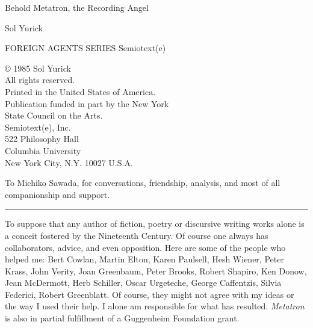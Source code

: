 \documentclass[11pt,twoside,draft]{memoir}
\newcommand{\titlePageTitle}[1]{ 
{ \Large #1 }}
\newcommand{\titlePageAuthor}[1]{ 
{ \large #1 }}
\begin{document}

{
	\raggedright
\titlePageTitle{Behold Metatron, the Recording Angel} \linebreak
\titlePageAuthor{Sol Yurick} \par
}

\clearpage 


{
FOREIGN AGENTS SERIES
Semiotext(e)

© 1985 Sol Yurick \\
All rights reserved. \\
Printed in the United States of America. \\
Publication funded in part by the New York \\
State Council on the Arts. \\

Semiotext(e), Inc.\\

522 Philosophy Hall \\
Columbia University \\
New York City, N.Y. 10027 U.S.A. 
}

\clearpage

{
	To Michiko Sawada, for conversations, friendship, analysis, and most of all companionship and support.

\plainbreak{2}

To suppose that any author of fiction, poetry or discursive writing works alone is a conceit fostered by the Nineteenth Century. Of course one always has collaborators, advice, and even opposition. Here are some of the people who helped me: Bert Cowlan, Martin Elton, Karen Paulsell, Hesh Wiener, Peter Krass, John Verity, Joan Greenbaum, Peter Brooks, Robert Shapiro, Ken Donow, Jean McDermott, Herb Schiller, Oscar Urgeteche, George Caffentzis, Silvia Federici, Robert Greenblatt. Of course, they might not agree with my ideas or the way I used their help. I alone am responsible for what has resulted. \emph{Metatron} is also in partial fulfillment of a Guggenheim Foundation grant.
}

\clearpage

\mainmatter
{}
\openany
\pagestyle{simple}
















\end{document}
